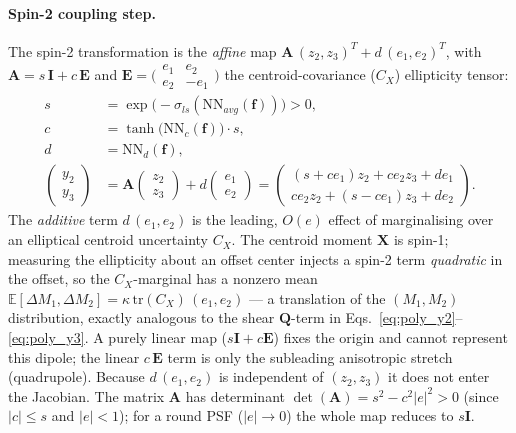\paragraph{Spin-2 coupling step.}
The spin-2 transformation is the \emph{affine} map
$\mathbf{A}\,(z_2,z_3)^T + d\,(e_1,e_2)^T$, with
$\mathbf{A} = s\,\mathbf{I} + c\,\mathbf{E}$ and
$\mathbf{E}=\bigl(\begin{smallmatrix}e_1&e_2\\e_2&-e_1\end{smallmatrix}\bigr)$
the centroid-covariance ($C_X$) ellipticity tensor:
\begin{align}
  s &= \exp\!\bigl(-\sigma_{ls}(\mathrm{NN}_{avg}(\mathbf{f}))\bigr)>0,\label{eq:sx_s}\\
  c &= \tanh\!\bigl(\mathrm{NN}_c(\mathbf{f})\bigr)\cdot s,\label{eq:sx_c}\\
  d &= \mathrm{NN}_d(\mathbf{f}),\label{eq:sx_d}\\
  \begin{pmatrix}y_2\\y_3\end{pmatrix}
    &= \mathbf{A}\begin{pmatrix}z_2\\z_3\end{pmatrix} + d\begin{pmatrix}e_1\\e_2\end{pmatrix}
    = \begin{pmatrix}(s+ce_1)z_2+ce_2 z_3 + d e_1\\
                     ce_2 z_2+(s-ce_1)z_3 + d e_2\end{pmatrix}.\label{eq:sx_A}
\end{align}
The \emph{additive} term $d\,(e_1,e_2)$ is the leading, $O(e)$ effect of
marginalising over an elliptical centroid uncertainty $C_X$.  The centroid
moment $\mathbf{X}$ is spin-1; measuring the ellipticity about an offset center
injects a spin-2 term \emph{quadratic} in the offset, so the $C_X$-marginal has a
nonzero mean
$\mathbb{E}[\Delta M_1,\Delta M_2]=\kappa\,\mathrm{tr}(C_X)\,(e_1,e_2)$ — a
translation of the $(M_1,M_2)$ distribution, exactly analogous to the shear
$\mathbf{Q}$-term in Eqs.~\eqref{eq:poly_y2}--\eqref{eq:poly_y3}.  A purely linear
map ($s\mathbf{I}+c\mathbf{E}$) fixes the origin and cannot represent this
dipole; the linear $c\,\mathbf{E}$ term is only the subleading anisotropic
stretch (quadrupole).  Because $d\,(e_1,e_2)$ is independent of $(z_2,z_3)$ it
does not enter the Jacobian.  The matrix $\mathbf{A}$ has determinant
$\det(\mathbf{A})=s^2-c^2|e|^2>0$ (since $|c|\le s$ and $|e|<1$); for a round PSF
($|e|\to 0$) the whole map reduces to $s\mathbf{I}$.

